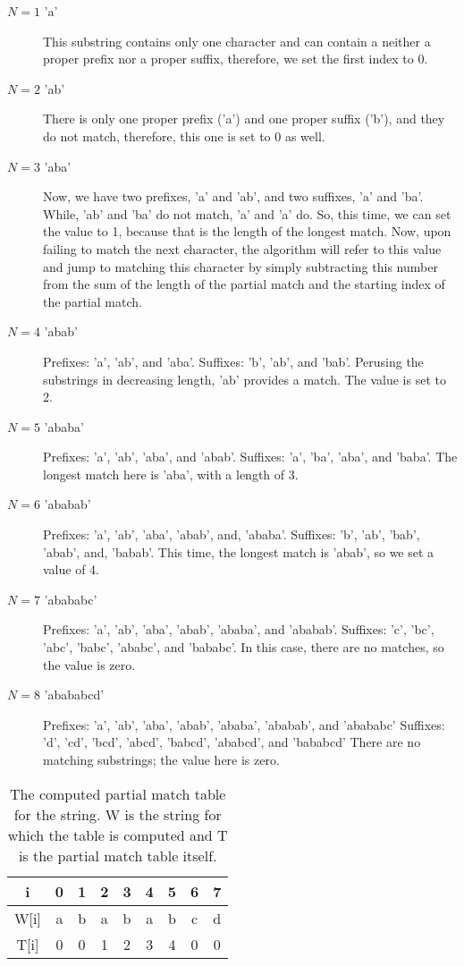 \begin{description}
\item[$N = 1$ 'a']
This substring contains only one character and can contain a neither a proper prefix nor a proper suffix, therefore, we set the first index to 0.

\item[$N = 2$ 'ab']
There is only one proper prefix ('a') and one proper suffix ('b'), and they do not match, therefore, this one is set to 0 as well.

\item[$N = 3$ 'aba']
Now, we have two prefixes, 'a' and 'ab', and two suffixes, 'a' and 'ba'.
While, 'ab' and 'ba' do not match, 'a' and 'a' do.
So, this time, we can set the value to 1, because that is the length of the longest match.
Now, upon failing to match the next character, the algorithm will refer to this value and jump to matching this character by simply subtracting this number from the sum of the length of the partial match and the starting index of the partial match.

\item[$N = 4$ 'abab']
Prefixes: 'a', 'ab', and 'aba'.
Suffixes: 'b', 'ab', and 'bab'.
Perusing the substrings in decreasing length, 'ab' provides a match. The value is set to 2.

\item[$N = 5$ 'ababa']
Prefixes: 'a', 'ab', 'aba', and 'abab'.
Suffixes: 'a', 'ba', 'aba', and 'baba'.
The longest match here is 'aba', with a length of 3.

\item[$N = 6$ 'ababab']
Prefixes: 'a', 'ab', 'aba', 'abab', and, 'ababa'.
Suffixes: 'b', 'ab', 'bab', 'abab', and, 'babab'.
This time, the longest match is 'abab', so we set a value of 4.

\item[$N = 7$ 'abababc']
Prefixes: 'a', 'ab', 'aba', 'abab', 'ababa', and 'ababab'.
Suffixes: 'c', 'bc', 'abc', 'babc', 'ababc', and 'bababc'.
In this case, there are no matches, so the value is zero.

\item[$N = 8$ 'abababcd']
Prefixes: 'a', 'ab', 'aba', 'abab', 'ababa', 'ababab', and 'abababc'
Suffixes: 'd', 'cd', 'bcd', 'abcd', 'babcd', 'ababcd', and 'bababcd'
There are no matching substrings; the value here is zero.
\end{description}

\begin{table}[h]
	\begin{center}
		\begin{tabular}{ | c | c | c | c | c | c | c | c | c | }
			\hline
			i     & 0 & 1 & 2 & 3 & 4 & 5 & 6 & 7 \\ \hline
			W[i]  & a & b & a & b & a & b & c & d \\ \hline
			T[i]  & 0 & 0 & 1 & 2 & 3 & 4 & 0 & 0 \\ \hline
		\end{tabular}
		\caption{The computed partial match table for the string.
		W is the string for which the table is computed and T is the partial match table itself.}
	\end{center}
\end{table}

